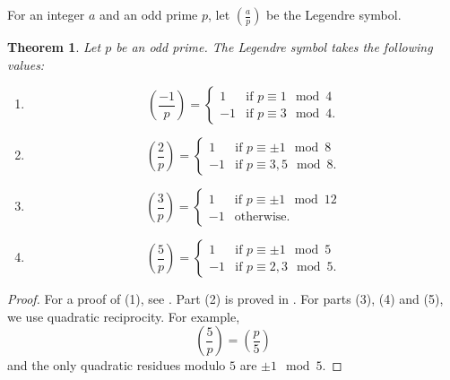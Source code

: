 \documentclass[12pt]{article}
\newtheorem*{thm}{Theorem}
\theoremstyle{definition}
\begin{document}
For an integer $a$ and an odd prime $p$, let $\displaystyle \left(\frac{a}{p}\right)$ be the Legendre symbol.

\begin{thm}
Let $p$ be an odd prime. The Legendre symbol takes the following values:
\begin{enumerate}
\item \[
\left(\frac{-1}{p}\right) =
\begin{cases}
1 &\text{if }p \equiv 1 \mod 4\\
-1 &\text{if }p \equiv 3 \mod 4.
\end{cases}
\]
\item \[
\left(\frac{2}{p}\right) =
\begin{cases}
1 &\text{if }p\equiv \pm 1 \mod 8\\
-1 &\text{if }p\equiv 3,5 \mod 8.
\end{cases}
\]
\item \[
\left(\frac{3}{p}\right) =
\begin{cases}
1 &\text{if }p\equiv \pm 1 \mod 12\\
-1 &\text{otherwise.}
\end{cases}
\]
\item \[
\left(\frac{5}{p}\right) =
\begin{cases}
1 &\text{if }p\equiv \pm 1 \mod 5\\
-1 &\text{if }p\equiv 2,3 \mod 5.
\end{cases}
\]
\end{enumerate}
\end{thm}
\begin{proof}
For a proof of (1), see . Part (2) is proved in . For parts (3), (4) and (5), we use quadratic reciprocity. For example, 
$$\left(\frac{5}{p}\right)=\left(\frac{p}{5}\right)$$
and the only quadratic residues modulo $5$ are $\pm 1 \mod 5$.
\end{proof}
\end{document}
